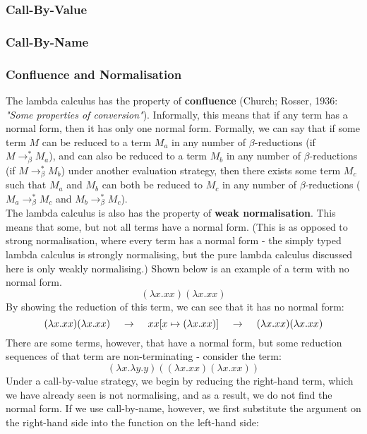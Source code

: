 \documentclass{article}
\begin{document}
\subsubsection{Call-By-Value}
\subsubsection{Call-By-Name}
\subsubsection{Confluence and Normalisation}
The lambda calculus has the property of \textbf{confluence} (Church; Rosser, 1936: \emph{"Some properties of conversion"}). Informally, this means that if any term has a normal form, then it has only one normal form. Formally, we can say that if some term $M$ can be reduced to a term $M_a$ in any number of $\beta$-reductions (if $M \rightarrow^{*}_{\beta} M_a$), and can also be reduced to a term $M_b$ in any number of $\beta$-reductions (if $M \rightarrow^{*}_{\beta} M_b$) under another evaluation strategy, then there exists some term $M_c$ such that $M_a$ and $M_b$ can both be reduced to $M_c$ in any number of $\beta$-reductions ($M_a \rightarrow^{*}_{\beta} M_c$ and $M_b \rightarrow^{*}_{\beta} M_c$).
\\\indent The lambda calculus is also has the property of \textbf{weak normalisation}. This means that some, but not all terms have a normal form. (This is as opposed to strong normalisation, where every term has a normal form - the simply typed lambda calculus is strongly normalising, but the pure lambda calculus discussed here is only weakly normalising.) Shown below is an example of a term with no normal form.
\[ (\lambda x.xx)(\lambda x.xx) \]
By showing the reduction of this term, we can see that it has no normal form:
\[ (\lambda x.xx)(\lambda x.xx) \hspace{4mm} \rightarrow \hspace{4mm} xx[x \mapsto (\lambda x.xx)] \hspace{4mm} \rightarrow \hspace{4mm} (\lambda x.xx)(\lambda x.xx) \]
There are some terms, however, that have a normal form, but some reduction sequences of that term are non-terminating - consider the term:
\[ (\lambda x.\lambda y.y)((\lambda x.xx)(\lambda x.xx)) \]
Under a call-by-value strategy, we begin by reducing the right-hand term, which we have already seen is not normalising, and as a result, we do not find the normal form. If we use call-by-name, however, we first substitute the argument on the right-hand side into the function on the left-hand side:
\end{document}
